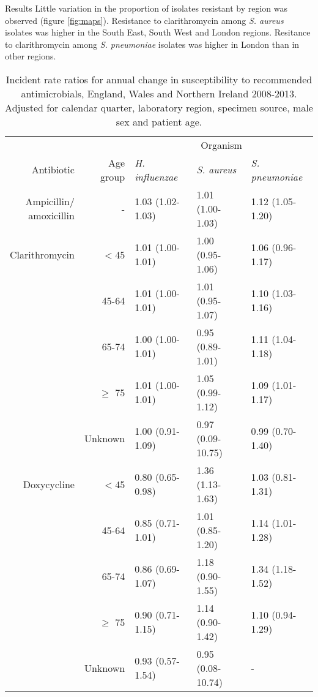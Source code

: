 \documentclass[final, 14pt]{beamer}
\begin{document}
\begin{frame}
\begin{columns}[t]
\begin{minipage}[t]{.95\textwidth}
\begin{block}{Results}
   Little variation in the proportion of isolates resistant by region was observed (figure \ref{fig:maps}). 
   Resistance to clarithromycin among \textit{S. aureus} isolates was higher in the South East, South West and London regions. 
   Resitance to clarithromycin among \textit{S. pneumoniae} isolates was higher in London than in other regions. \\
     \begin{table}
   \centering
   \small%
   \begin{tabular}{rrlll}
  \hline
 &  & \multicolumn{3}{c}{Organism}\\
  \cline{3-5}
Antibiotic & \shortstack{Age \\group} & \textit{H. influenzae} & \textit{S. aureus} & \textit{S. pneumoniae} \\ 
  \midrule
\shortstack{Ampicillin/\\amoxicillin} & - & 1.03 (1.02-1.03) & 1.01 (1.00-1.03) & 1.12 (1.05-1.20) \\ 
Clarithromycin & $<$45 & 1.01 (1.00-1.01) & 1.00 (0.95-1.06) & 1.06 (0.96-1.17) \\ 
  & 45-64 & 1.01 (1.00-1.01) & 1.01 (0.95-1.07) & 1.10 (1.03-1.16) \\ 
  & 65-74 & 1.00 (1.00-1.01) & 0.95 (0.89-1.01) & 1.11 (1.04-1.18) \\ 
  & $\ge$ 75 & 1.01 (1.00-1.01) & 1.05 (0.99-1.12) & 1.09 (1.01-1.17) \\ 
  & Unknown & 1.00 (0.91-1.09) & 0.97 (0.09-10.75) & 0.99 (0.70-1.40) \\ 
Doxycycline & $<$45 & 0.80 (0.65-0.98) & 1.36 (1.13-1.63) & 1.03 (0.81-1.31) \\ 
  & 45-64 & 0.85 (0.71-1.01) & 1.01 (0.85-1.20) & 1.14 (1.01-1.28) \\ 
  & 65-74 & 0.86 (0.69-1.07) & 1.18 (0.90-1.55) & 1.34 (1.18-1.52) \\ 
  & $\ge$ 75 & 0.90 (0.71-1.15) & 1.14 (0.90-1.42) & 1.10 (0.94-1.29) \\ 
  & Unknown & 0.93 (0.57-1.54) & 0.95 (0.08-10.74) & - \\ 
\bottomrule  
\end{tabular}
   \caption{Incident rate ratios for annual change in susceptibility to recommended antimicrobials, England, Wales and Northern Ireland 2008-2013.
   Adjusted for calendar quarter, laboratory region, specimen source, male sex and patient age.}
   \label{tab:table1}
   \end{table} 


\end{block}
\end{minipage}
\end{columns}
\end{frame}
\end{document}
